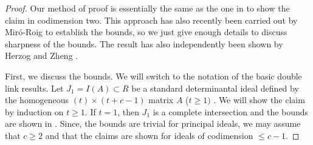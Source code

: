 \documentclass[12pt,twoside]{amsart}
\numberwithin{equation}{section}
\theoremstyle{definition}
\begin{document}
\begin{proof}
Our method of proof is essentially the same as the one in \cite{MNR} to show the claim in
codimension two.  This approach has also recently been carried out by Mir\'o-Roig
\cite{rosapaper} to establish the bounds, so we just give enough details to discuss
sharpness of the bounds. The result has also independently been shown by Herzog and Zheng
\cite{H}.

First, we discuss the bounds. We will switch to the notation of the basic double link
results. Let $J_1 = I(A) \subset R$ be a standard determinantal ideal defined by the
homogeneous $(t) \times (t+c-1)$ matrix $A$ ($t \geq 1)$ . We will show the claim by
induction on $t \geq 1$. If $t = 1$, then $J_1$ is a complete intersection and the bounds
are shown in \cite{HS}. Since, the bounds are trivial for principal ideals, we may assume
that $c \geq 2$ and that the claims are shown for ideals of codimension $\leq c-1$.


\end{proof}
\end{document}
